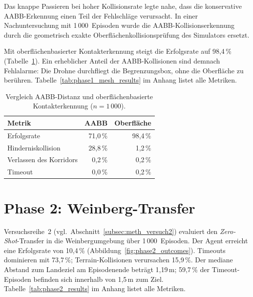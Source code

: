 Das knappe Passieren bei hoher Kollisionsrate legte nahe, dass die
konservative AABB-Erkennung einen Teil der Fehlschläge verursacht. In
einer Nachuntersuchung mit 1\,000~Episoden wurde die
AABB-Kollisionserkennung durch die geometrisch exakte
Oberflächenkollisionsprüfung des Simulators ersetzt.

Mit oberflächenbasierter Kontakterkennung steigt die Erfolgsrate auf
98,4\,\% (Tabelle~\ref{tab:phase1_mesh_contacts}). Ein erheblicher
Anteil der AABB-Kollisionen sind demnach Fehlalarme: Die Drohne
durchfliegt die Begrenzungsbox, ohne die Oberfläche zu berühren.
Tabelle~\ref{tab:phase1_mesh_results} im Anhang listet alle Metriken.

\begin{table}[H]
  \centering
  \caption[Vergleich AABB- und oberflächenbasierte Kollisionserkennung]{Vergleich
  AABB-Distanz und oberflächenbasierte Kontakterkennung ($n = 1\,000$).}
  \label{tab:phase1_mesh_contacts}
  \small
  \renewcommand{\arraystretch}{1.1}
  \begin{tabular}{l r r}
    \toprule
    \textbf{Metrik} & \textbf{AABB} & \textbf{Oberfläche} \\
    \midrule
    Erfolgsrate                       & 71,0\,\%    & 98,4\,\% \\
    Hinderniskollision                & 28,8\,\%    & 1,2\,\% \\
    Verlassen des Korridors           & 0,2\,\%     & 0,2\,\% \\
    Timeout                           & 0,0\,\%     & 0,2\,\% \\
    \bottomrule
  \end{tabular}
\end{table}


\section{Phase 2: Weinberg-Transfer}
\label{sec:phase2}

Versuchsreihe~2 (vgl.\ Abschnitt~\ref{subsec:meth_versuch2}) evaluiert den
\textit{Zero-Shot}-Transfer in die Weinbergumgebung über 1\,000~Episoden. Der Agent
erreicht eine Erfolgsrate von 10,4\,\%
(Abbildung~\ref{fig:phase2_outcomes}). Timeouts dominieren mit 73,7\,\%;
Terrain-Kollisionen verursachen 15,9\,\%. Der mediane Abstand zum
Landeziel am Episodenende beträgt 1,19\,m; 59,7\,\% der
Timeout-Episoden befinden sich innerhalb von 1,5\,m zum Ziel.
Tabelle~\ref{tab:phase2_results} im Anhang listet alle Metriken.

